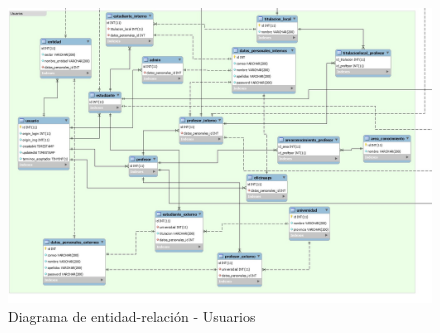 \documentclass[11pt]{book}
\begin{document}
\begin{figure}[t]
	\centering
	\includegraphics[scale=0.4]{usuarios}
	\caption{Diagrama de entidad-relación - Usuarios}
	\label{fig:usuarios}
\end{figure}
\end{document}
